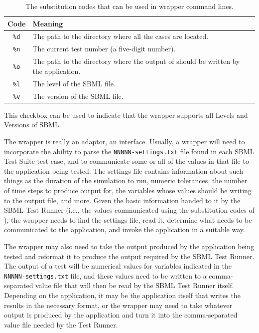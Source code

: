 \documentclass{sbmlpkgspec}
\begin{document}
\begin{description}[style=multiline,leftmargin=1.4in]
\begin{table}[t]
  \begin{tabular}{cl}
    \toprule
    \textbf{Code} & \textbf{Meaning} \\
    \midrule
    \texttt{\%d} & The path to the directory where all the cases are located.
    \\
    \texttt{\%n} & The current test number (a five-digit number).
    \\
    \texttt{\%o} & The path to the directory where the output of should be written by the application.
    \\
    \texttt{\%l} & The level of the SBML file.
    \\
    \texttt{\%v} & The version of the SBML file.
    \\
    \bottomrule
  \end{tabular}
  \caption{The substitution codes that can be used in wrapper command lines.}
  \label{substitutions}
\end{table}


\item[Wrapper can run any SBML Level/Version] This checkbox can be used to indicate that the wrapper supports all Levels and Versions of SBML.

\end{description}

The wrapper is really an adaptor, an interface.  Usually, a wrapper will need to incorporate the ability to parse the \texttt{NNNNN-settings.txt} file found in each SBML Test Suite test case, and to communicate some or all of the values in that file to the application being tested.  The settings file contains information about such things as the duration of the simulation to run, numeric tolerances, the number of time steps to produce output for, the variables whose values should be writing to the output file, and more.  Given the basic information handed to it by the SBML Test Runner (i.e., the values communicated using the substitution codes of ), the wrapper needs to find the settings file, read it, determine what needs to be communicated to the application, and invoke the application in a suitable way.

The wrapper may also need to take the output produced by the application being tested and reformat it to produce the output required by the SBML Test Runner.  The output of a test will be numerical values for variables indicated in the \texttt{NNNNN-settings.txt} file, and these values need to be written to a comma-separated value file that will then be read by the SBML Test Runner itself.  Depending on the application, it may be the application itself that writes the results in the necessary format, or the wrapper may need to take whatever output is produced by the application and turn it into the comma-separated value file needed by the Test Runner.
\end{document}
